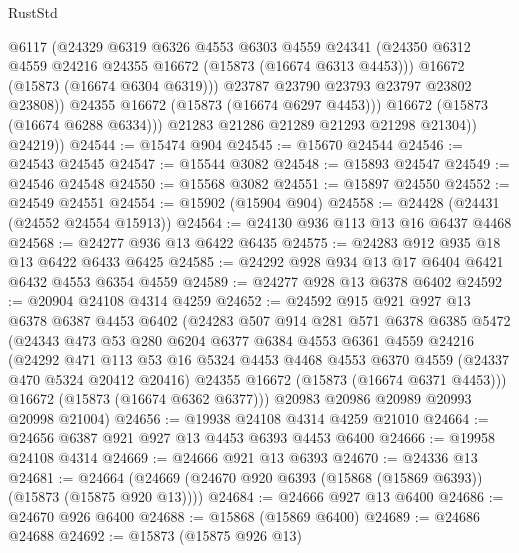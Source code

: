 \begin{lexlean}{RustStd}
\begin{coremodule}
                    @6117
                    (@24329
                      @6319
                      @6326
                      @4553
                      @6303
                      @4559
                      @24341
                      (@24350 @6312 @4559 @24216 @24355 @16672 (@15873 (@16674 @6313 @4453)))
                      @16672
                      (@15873 (@16674 @6304 @6319)))
                    @23787
                    @23790
                    @23793
                    @23797
                    @23802
                    @23808))
                @24355
                @16672
                (@15873 (@16674 @6297 @4453)))
              @16672
              (@15873 (@16674 @6288 @6334)))
            @21283
            @21286
            @21289
            @21293
            @21298
            @21304))
        @24219))
@24544 := @15474 @904
@24545 := @15670 @24544
@24546 := @24543 @24545
@24547 := @15544 @3082
@24548 := @15893 @24547
@24549 := @24546 @24548
@24550 := @15568 @3082
@24551 := @15897 @24550
@24552 := @24549 @24551
@24554 := @15902 (@15904 @904)
@24558 := @24428 (@24431 (@24552 @24554 @15913))
@24564 := @24130 @936 @113 @13 @16 @6437 @4468
@24568 := @24277 @936 @13 @6422 @6435
@24575 := @24283 @912 @935 @18 @13 @6422 @6433 @6425
@24585 := @24292 @928 @934 @13 @17 @6404 @6421 @6432 @4553 @6354 @4559
@24589 := @24277 @928 @13 @6378 @6402
@24592 := @20904 @24108 @4314 @4259
@24652 := @24592
    @915
    @921
    @927
    @13
    @6378
    @6387
    @4453
    @6402
    (@24283
      @507
      @914
      @281
      @571
      @6378
      @6385
      @5472
      (@24343
        @473
        @53
        @280
        @6204
        @6377
        @6384
        @4553
        @6361
        @4559
        @24216
        (@24292
          @471
          @113
          @53
          @16
          @5324
          @4453
          @4468
          @4553
          @6370
          @4559
          (@24337 @470 @5324 @20412 @20416)
          @24355
          @16672
          (@15873 (@16674 @6371 @4453)))
        @16672
        (@15873 (@16674 @6362 @6377)))
      @20983
      @20986
      @20989
      @20993
      @20998
      @21004)
@24656 := @19938 @24108 @4314 @4259 @21010
@24664 := @24656 @6387 @921 @927 @13 @4453 @6393 @4453 @6400
@24666 := @19958 @24108 @4314
@24669 := @24666 @921 @13 @6393
@24670 := @24336 @13
@24681 := @24664 (@24669 (@24670 @920 @6393 (@15868 (@15869 @6393)) (@15873 (@15875 @920 @13))))
@24684 := @24666 @927 @13 @6400
@24686 := @24670 @926 @6400
@24688 := @15868 (@15869 @6400)
@24689 := @24686 @24688
@24692 := @15873 (@15875 @926 @13)

\end{coremodule}
\end{lexlean}
